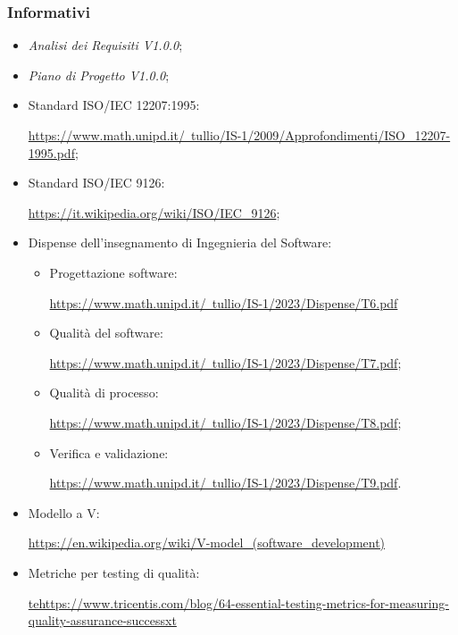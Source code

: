     \subsubsection{Informativi}
        \begin{itemize}
            \item \textit{Analisi dei Requisiti V1.0.0};
            \item \textit{Piano di Progetto V1.0.0};
            \item Standard ISO/IEC 12207:1995:
            
                \href{https://www.math.unipd.it/~tullio/IS-1/2009/Approfondimenti/ISO_12207-1995.pdf}{https://www.math.unipd.it/~tullio/IS-1/2009/Approfondimenti/ISO\_12207-1995.pdf};

            \item Standard ISO/IEC 9126:
            
                 \href{https://it.wikipedia.org/wiki/ISO/IEC_9126}{https://it.wikipedia.org/wiki/ISO/IEC\_9126};
            \clearpage
            \item Dispense dell'insegnamento di Ingegnieria del Software:
                \begin{itemize}
                    \item Progettazione software:
                    
                        \href{https://www.math.unipd.it/~tullio/IS-1/2023/Dispense/T6.pdf}{https://www.math.unipd.it/~tullio/IS-1/2023/Dispense/T6.pdf}

                    \item Qualità del software:
                    
                        \href{https://www.math.unipd.it/~tullio/IS-1/2023/Dispense/T7.pdf}{https://www.math.unipd.it/~tullio/IS-1/2023/Dispense/T7.pdf};

                    \item Qualità di processo:
                    
                    \href{https://www.math.unipd.it/~tullio/IS-1/2023/Dispense/T8.pdf}{https://www.math.unipd.it/~tullio/IS-1/2023/Dispense/T8.pdf};


                    \item Verifica e validazione:
                    
                    \href{https://www.math.unipd.it/~tullio/IS-1/2023/Dispense/T9.pdf}{https://www.math.unipd.it/~tullio/IS-1/2023/Dispense/T9.pdf}.
                \end{itemize}
            \item Modello a V:
            
                \href{https://en.wikipedia.org/wiki/V-model_(software_development)}{https://en.wikipedia.org/wiki/V-model\_(software\_development)}
            \item Metriche per testing di qualità:
            
                \href{https://www.tricentis.com/blog/64-essential-testing-metrics-for-measuring-quality-assurance-success}{tehttps://www.tricentis.com/blog/64-essential-testing-metrics-for-measuring-quality-assurance-successxt}
        \end{itemize}
        \clearpage


